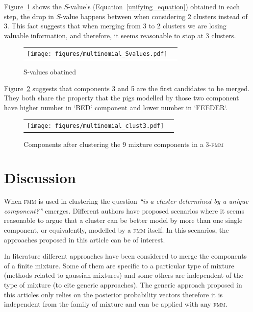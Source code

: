 \documentclass[10pt, a4paper]{article}
\newcommand{\fmm}{\textsc{fmm}\xspace}
\begin{document}
\begin{spacing}{1.9}
Figure~\ref{multinomial_Svalues} shows the $S$-value's (Equation~\ref{unifying_equation}) obtained in each step, the drop in $S$-value happens between when considering 2 clusters instead of 3. This fact suggests that when merging from 3 to 2 clusters we are losing valuable information, and therefore, it seems reasonable to stop at 3 clusters.

\begin{figure}[t]
\begin{center}
\begin{tabular}{cc}
  \texttt{[image: figures/multinomial\_Svalues.pdf]} \\
 \end{tabular}
 \caption{S-values obatined}\label{multinomial_Svalues}
\end{center}
\end{figure}

Figure~\ref{multinomial_clust3} suggests that components 3 and 5 are the first candidates to be merged. They both share the property that the pigs modelled by those two component have higher number in `BED` component and lower number in `FEEDER`.

\begin{figure}[t]
\begin{center}
\begin{tabular}{cc}
  \texttt{[image: figures/multinomial\_clust3.pdf]} \\
 \end{tabular}
 \caption{Components after clustering the 9 mixture components in a 3-\fmm}\label{multinomial_clust3}
\end{center}
\end{figure}

\section{Discussion}

When \fmm is used in clustering the question \textit{``is a cluster determined by a unique component?''} emerges. Different authors have proposed scenarios where it seems reasonable to argue that a cluster can be better model by more than one single component, or equivalently, modelled by a \fmm itself. In this scenarios, the approaches proposed in this article can be of interest.

In literature different approaches have been considered to merge the components of a finite mixture. Some of them are specific to a particular type of mixture (methods related to gaussian mixtures) and some others are independent of the type of mixture (to cite generic approaches). The generic approach proposed in this articles only relies  on the posterior probability vectors therefore it is independent from the family of mixture and can be applied with any \fmm.


\end{spacing}
\end{document}
